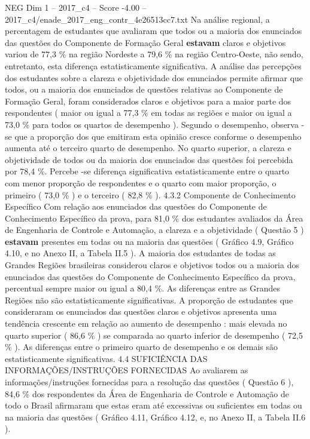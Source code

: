 \begin{textsample}{NEG Dim 1 – 2017\_c4 – Score -4.00 – 2017\_c4/enade\_2017\_eng\_contr\_4e26513cc7.txt}
Na análise regional, a percentagem de estudantes que avaliaram que todos ou a maioria dos enunciados das questões do Componente de Formação Geral \textbf{estavam} claros e objetivos variou de 77,3 \% na região Nordeste a 79,6 \% na região Centro-Oeste, não sendo, entretanto, esta diferença estatisticamente significativa.
A análise das percepções dos estudantes sobre a clareza e objetividade dos enunciados permite afirmar que todos, ou a maioria dos enunciados de questões relativas ao Componente de Formação Geral, foram considerados claros e objetivos para a maior parte dos respondentes ( maior ou igual a 77,3 \% em todas as regiões e maior ou igual a 73,0 \% para todos os quartos de desempenho ).
Segundo o desempenho, observa -se que a proporção dos que emitiram esta opinião cresce conforme o desempenho aumenta até o terceiro quarto de desempenho.
No quarto superior, a clareza e objetividade de todos ou da maioria dos enunciados das questões foi percebida por 78,4 \%.
Percebe -se diferença significativa estatisticamente entre o quarto com menor proporção de respondentes e o quarto com maior proporção, o primeiro ( 73,0 \% ) e o terceiro ( 82,8 \% ). 4.3.2 Componente de Conhecimento Específico Com relação aos enunciados das questões do Componente de Conhecimento Específico da prova, para 81,0 \% dos estudantes avaliados da Área de Engenharia de Controle e Automação, a clareza e a objetividade ( Questão 5 ) \textbf{estavam} presentes em todas ou na maioria das questões ( Gráfico 4.9, Gráfico 4.10, e no Anexo II, a Tabela II.5 ).
A maioria dos estudantes de todas as Grandes Regiões brasileiras considerou claros e objetivos todos ou a maioria dos enunciados das questões do Componente de Conhecimento Específico da prova, percentual sempre maior ou igual a 80,4 \%.
As diferenças entre as Grandes Regiões não são estatisticamente significativas.
A proporção de estudantes que consideraram os enunciados das questões claros e objetivos apresenta uma tendência crescente em relação ao aumento de desempenho : mais elevada no quarto superior ( 86,6 \% ) se comparada ao quarto inferior de desempenho ( 72,5 \% ).
As diferenças entre o primeiro quarto de desempenho e os demais são estatisticamente significativas. 4.4 SUFICIÊNCIA DAS INFORMAÇÕES/INSTRUÇÕES FORNECIDAS Ao avaliarem as informações/instruções fornecidas para a resolução das questões ( Questão 6 ), 84,6 \% dos respondentes da Área de Engenharia de Controle e Automação de todo o Brasil afirmaram que estas eram até excessivas ou suficientes em todas ou na maioria das questões ( Gráfico 4.11, Gráfico 4.12, e, no Anexo II, a Tabela II.6 ).

\end{textsample}
